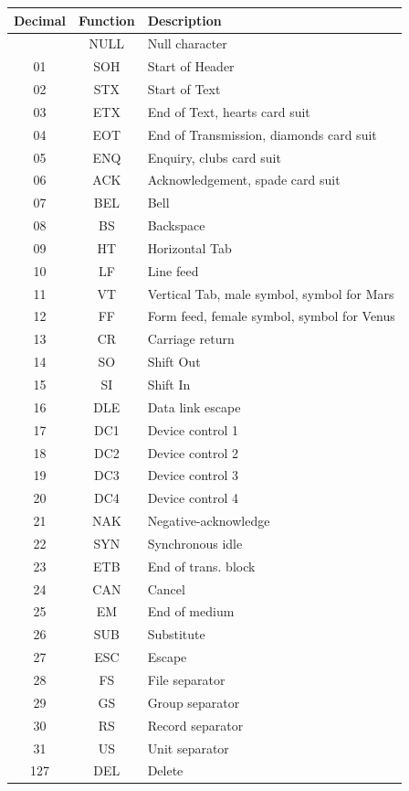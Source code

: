 \begin{longtable}{|c|c|l|}
\hline
\textbf{Decimal} & \textbf{Function} & \textbf{Description} \\
\hline
\endhead
\hline
\endfoot
\hline
\endlastfoot
00 & NULL & Null character \\
\hline
01 & SOH & Start of Header \\
\hline
02 & STX & Start of Text \\
\hline
03 & ETX & End of Text, hearts card suit \\
\hline
04 & EOT & End of Transmission, diamonds card suit \\
\hline
05 & ENQ & Enquiry, clubs card suit \\
\hline
06 & ACK & Acknowledgement, spade card suit \\
\hline
07 & BEL & Bell \\
\hline
08 & BS & Backspace \\
\hline
09 & HT & Horizontal Tab \\
\hline
10 & LF & Line feed \\
\hline
11 & VT & Vertical Tab, male symbol, symbol for Mars \\
\hline
12 & FF & Form feed, female symbol, symbol for Venus \\
\hline
13 & CR & Carriage return \\
\hline
14 & SO & Shift Out \\
\hline
15 & SI & Shift In \\
\hline
16 & DLE & Data link escape \\
\hline
17 & DC1 & Device control 1 \\
\hline
18 & DC2 & Device control 2 \\
\hline
19 & DC3 & Device control 3 \\
\hline
20 & DC4 & Device control 4 \\
\hline
21 & NAK & Negative-acknowledge \\
\hline
22 & SYN & Synchronous idle \\
\hline
23 & ETB & End of trans. block \\
\hline
24 & CAN & Cancel \\
\hline
25 & EM & End of medium \\
\hline
26 & SUB & Substitute \\
\hline
27 & ESC & Escape \\
\hline
28 & FS & File separator \\
\hline
29 & GS & Group separator \\
\hline
30 & RS & Record separator \\
\hline
31 & US & Unit separator \\
\hline
127 & DEL & Delete \\
\hline

\end{longtable}



